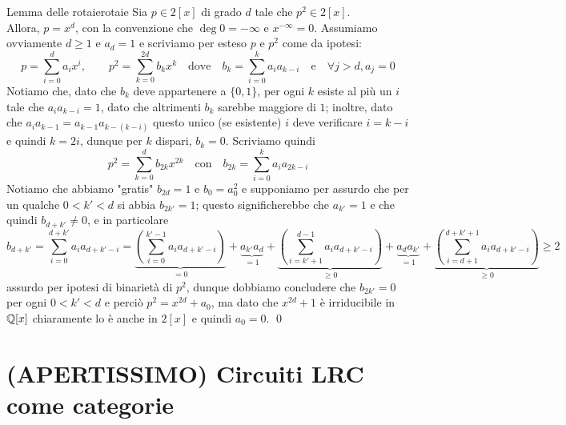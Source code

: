\documentclass[openany]{book}
\begin{document}
\begin{lemma}{Lemma delle rotaie}{rotaie}
    Sia $p \in 2[x]$ di grado $d$ tale che $p^2 \in 2[x]$.\\
    Allora, $p=x^d$, con la convenzione che $\deg 0= -\infty$ e $x^{-\infty}=0$.
    \proof
    Assumiamo ovviamente $d\ge 1$ e $a_d=1$ e scriviamo per esteso $p$ e $p^2$ come da ipotesi:
    \[ p = \sum_{i=0}^d a_i x^i, \qquad p^2 = \sum_{k=0}^{2d} b_k x^k \quad\text{dove}\quad b_k = \sum_{i=0}^k a_i a_{k-i} \quad\text{e}\quad \forall j > d, a_j=0\]
    Notiamo che, dato che $b_k$ deve appartenere a $\{0,1\}$, per ogni $k$ esiste al più un $i$ tale che $a_i a_{k-i} = 1$, dato che altrimenti $b_k$ sarebbe maggiore di $1$; inoltre, dato che $a_i a_{k-1} = a_{k-1} a_{k-(k-i)}$ questo unico (se esistente) $i$ deve verificare $i = k-i$ e quindi $k=2i$, dunque per $k$ dispari, $b_k = 0$. Scriviamo quindi
    \[ p^2 = \sum_{k=0}^d b_{2k} x^{2k} \quad \text{con}\quad b_{2k} = \sum_{i=0}^{k}a_{i}a_{2k-i} \]
    Notiamo che abbiamo "gratis" $b_{2d} = 1$ e $b_0 = a_0^2$ e supponiamo per assurdo che per un qualche $0<k'<d$ si abbia $b_{2k'}=1$; questo significherebbe che $a_{k'}=1$ e che quindi $b_{d+k'}\neq 0$, e in particolare
    \[ b_{d+k'} = \sum_{i=0}^{d+k'} a_i a_{d+k'-i} = \underbrace{\left(\sum_{i=0}^{k'-1} a_ia_{d+k'-i}\right)}_{=0} + \underbrace{a_{k'}a_{d}}_{=1} + \underbrace{\left(\sum_{i = k'+1}^{d-1} a_{i} a_{d+k'-i} \right)}_{\ge 0} + \underbrace{a_{d}a_{k'}}_{=1} + \underbrace{\left(\sum_{i=d+1}^{d+k'+1}a_i a_{d+k'-i}\right)}_{\ge 0}\ge 2\]
    assurdo per ipotesi di binarietà di $p^2$, dunque dobbiamo concludere che $b_{2k'} = 0$ per ogni $0<k'<d$ e perciò $p^2 = x^{2d} + a_0$, ma dato che $x^{2d} +1$ è irriducibile in $\mathbb{Q}[x]$ chiaramente lo è anche in $2[x]$ e quindi $a_0 = 0$.
    \qed
\end{lemma}

\chapter{(APERTISSIMO) Circuiti LRC come categorie}
\end{document}
